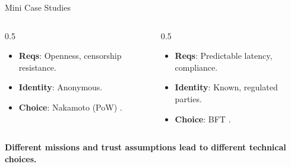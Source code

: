\documentclass[aspectratio=169]{beamer}
\begin{document}
\begin{frame}{Mini Case Studies}
\begin{columns}[T]
    \begin{column}{0.5\linewidth}
        \begin{tcolorbox}[enhanced, colback=d2s.fg!30, colframe=black, fonttitle=\bfseries, title={Case A: Public Payments (Bitcoin)}, rounded corners, drop shadow]
            \begin{itemize}
                \item \textbf{Reqs}: Openness, censorship resistance.
                \item \textbf{Identity}: Anonymous.
                \item \textbf{Choice}: Nakamoto (PoW) \cite{nakamoto_bitcoin_2008}.
            \end{itemize}
        \end{tcolorbox}
    \end{column}
    \begin{column}{0.5\linewidth}
        \begin{tcolorbox}[enhanced, colback=d2s.fg!30, colframe=black, fonttitle=\bfseries, title={Case B: Interbank Settlement}, rounded corners, drop shadow]
            \begin{itemize}
                \item \textbf{Reqs}: Predictable latency, compliance.
                \item \textbf{Identity}: Known, regulated parties.
                \item \textbf{Choice}: BFT \cite{castro_practical_1999}.
            \end{itemize}
        \end{tcolorbox}
    \end{column}
\end{columns}
\vfill
\begin{center}\textbf{Different missions and trust assumptions lead to different technical choices.}\end{center}
\end{frame}
\end{document}
